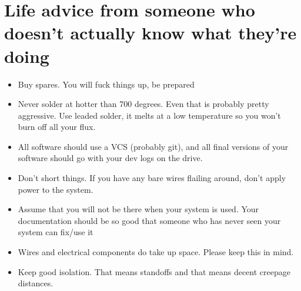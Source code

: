 \section{Life advice from someone who doesn't actually know what they're doing}
\begin{itemize}
\item Buy spares. You will fuck things up, be prepared
\item Never solder at hotter than 700 degrees. Even that is probably pretty aggressive. Use leaded solder, it melts at a low temperature so you won't burn off all your flux.
\item All software should use a VCS (probably git), and all final versions of your software should go with your dev logs on the drive.
\item Don't short things. If you have any bare wires flailing around, don't apply power to the system.
\item Assume that you will not be there when your system is used. Your documentation should be so good that someone who has never seen your system can fix/use it
\item Wires and electrical components do take up space. Please keep this in mind.
\item Keep good isolation. That means standoffs and that means decent creepage distances.
\end{itemize}


